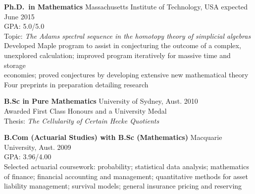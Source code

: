 \documentclass[margin,line]{resume}
\newcommand{\dashtab}{\makebox[1cm][r]{$-$ }}
\newcommand{\whitetab}{\makebox[1cm][r]{ }}
\newcommand{\twolineentry}[4]{\textbf{#1} #2 \hfill {#4}\\%
#3
           
\vspace{-3.4mm}}
\newcommand{\FINALtwolineentry}[4]{\textbf{#1} #2 \hfill {#4}\\%
#3\\\vspace{-.55cm}}
\begin{document}
\begin{resume}
\twolineentry{Ph.D.\ in Mathematics}{Massachusetts Institute of Technology, USA}{%
\dashtab GPA: 5.0/5.0\\%
\dashtab Topic: \emph{The Adams spectral sequence in the homotopy theory of simplicial algebras}\\%
\dashtab Developed Maple program to assist in conjecturing the outcome of a complex,\\
\whitetab unexplored calculation; improved program iteratively for massive time and storage\\
\whitetab economies; proved conjectures by developing extensive new mathematical theory \\
\dashtab Four preprints in preparation detailing research
}{expected June 2015}
\twolineentry{B.Sc in Pure Mathematics}{University of Sydney, Aust.}{%
\dashtab Awarded First Class Honours and a University Medal\\
\dashtab Thesis: \emph{The Cellularity of Certain Hecke Quotients}
}{2010}
\FINALtwolineentry{B.Com (Actuarial Studies) with B.Sc (Mathematics)}{Macquarie University, Aust.}{
\dashtab GPA: 3.96/4.00\\
\dashtab Selected actuarial coursework: probability; statistical data analysis; mathematics\\
\whitetab of finance; financial accounting and management; quantitative methods for asset\\
\whitetab liability management; survival models; general insurance pricing and reserving
}{2009}

\end{resume}
\end{document}
